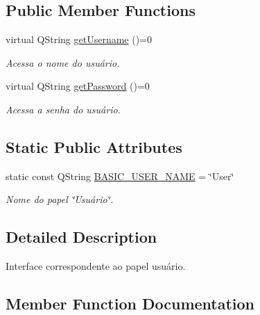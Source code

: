 \subsection*{Public Member Functions}
\begin{DoxyCompactItemize}
\item 
virtual Q\+String \hyperlink{classBasicUser_ae5ed7101550b9c9d280df5adf030975d}{get\+Username} ()=0
\begin{DoxyCompactList}\small\item\em Acessa o nome do usuário. \end{DoxyCompactList}\item 
virtual Q\+String \hyperlink{classBasicUser_a240bd2f9974357c921a79499355b1e18}{get\+Password} ()=0
\begin{DoxyCompactList}\small\item\em Acessa a senha do usuário. \end{DoxyCompactList}\end{DoxyCompactItemize}
\subsection*{Static Public Attributes}
\begin{DoxyCompactItemize}
\item 
static const Q\+String \hyperlink{classBasicUser_aaaea5b09e42b753e0ea0331797a48a3f}{B\+A\+S\+I\+C\+\_\+\+U\+S\+E\+R\+\_\+\+N\+A\+ME} = \char`\"{}User\char`\"{}\hypertarget{classBasicUser_aaaea5b09e42b753e0ea0331797a48a3f}{}\label{classBasicUser_aaaea5b09e42b753e0ea0331797a48a3f}

\begin{DoxyCompactList}\small\item\em Nome do papel \char`\"{}\+Usuário\char`\"{}. \end{DoxyCompactList}\end{DoxyCompactItemize}


\subsection{Detailed Description}
Interface correspondente ao papel usuário. 

\subsection{Member Function Documentation}
